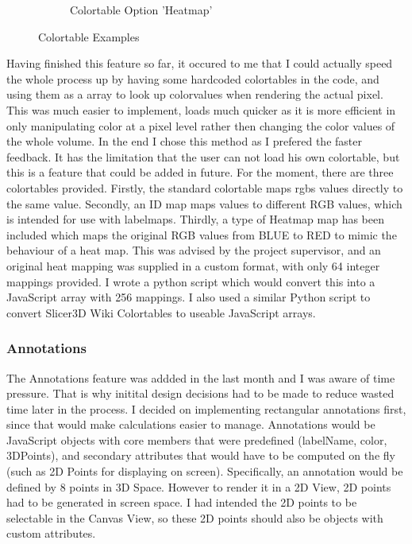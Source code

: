 \documentclass[a4paper,11pt,titlepage]{article}
\begin{document}
\begin{figure}
\begin{subfigure}{.33\textwidth}
  \caption{Colortable Option 'Heatmap'}
\end{subfigure}
\caption{Colortable Examples}

\end{figure}






Having finished this feature so far, it occured to me that I could actually speed the whole process up by having some hardcoded colortables in the code, and using them as a array to look up colorvalues when rendering the actual pixel. This was much easier to implement, loads much quicker as it is more efficient in only manipulating color at a pixel level rather then changing the color values of the whole volume. In the end I chose this method as I prefered the faster feedback. It has the limitation that the user can not load his own colortable, but this is a feature that could be added in future. For the moment, there are three colortables provided. Firstly, the standard colortable maps rgbs values directly to the same value. Secondly, an ID map maps values to different RGB values, which is intended for use with labelmaps. Thirdly, a type of Heatmap map has been included which maps the original RGB values from BLUE to RED to mimic the behaviour of a heat map. This was advised by the project supervisor, and an original heat mapping was supplied in a custom format, with only 64 integer mappings provided. I wrote a python script which would convert this into a JavaScript array with 256 mappings. I also used a similar Python script to convert Slicer3D Wiki Colortables to useable JavaScript arrays.



\subsubsection{Annotations}



The Annotations feature was addded in the last month and I was aware of time pressure. That is why initital design decisions had to be made to reduce wasted time later in the process. I decided on implementing rectangular annotations first, since that would make calculations easier to manage. Annotations would be JavaScript objects with core members that were predefined (labelName, color, 3DPoints), and secondary attributes that would have to be computed on the fly (such as 2D Points for displaying on screen). Specifically, an annotation would be defined by 8 points in 3D Space. However to render it in a 2D View, 2D points had to be generated in screen space. I had intended the 2D points to be selectable in the Canvas View, so these 2D points should also be objects with custom attributes.
\end{document}
